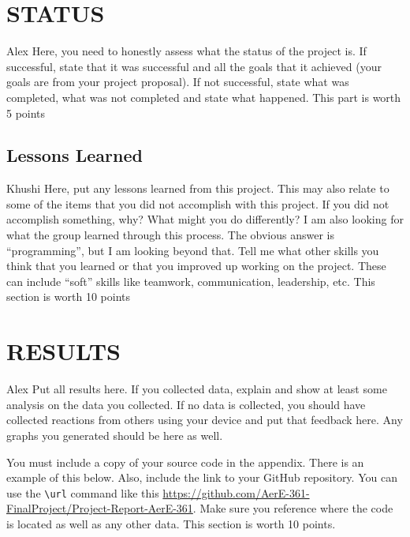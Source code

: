 \documentclass[12pt]{article}
\begin{document}





\section{STATUS}
Alex
Here, you need to honestly assess what the status of the project is.  If successful, state that it was successful and all the goals that it achieved (your goals are from your project proposal).  If not successful, state what was completed, what was not completed and state what happened. This part is worth 5 points

\subsection{Lessons Learned}
Khushi
Here, put any lessons learned from this project.  This may also relate to some of the items that you did not accomplish with this project. If you did not accomplish something, why? What might you do differently? I am also looking for what the group learned through this process. The obvious answer is ``programming'', but I am looking beyond that. Tell me what other skills you think that you learned or that you improved up working on the project. These can include ``soft'' skills like teamwork, communication, leadership, etc. This section is worth 10 points

\section{RESULTS}
 Alex
Put all results here.  If you collected data, explain and show at least some analysis on the data you collected.  If no data is collected, you should have collected reactions from others using your device and put that feedback here.  Any graphs you generated should be here as well.

You must include a copy of your source code in the appendix.  There is an example of this below.  Also, include the link to your GitHub repository.  You can use the \verb=\url=  command like this \url{https://github.com/AerE-361-FinalProject/Project-Report-AerE-361}. Make sure you reference where the code is located as well as any other data. This section is worth 10 points.
\end{document}
